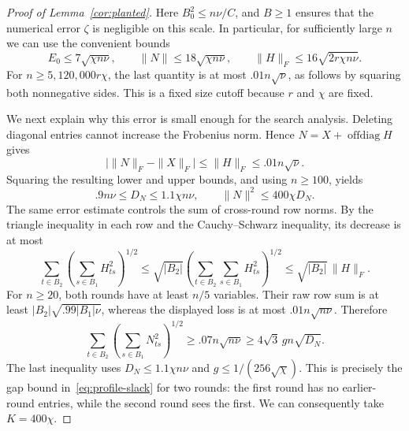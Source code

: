 \documentclass[11pt,a4paper]{article}
\theoremstyle{definition}
\theoremstyle{remark}
\begin{document}
\begin{proof}[Proof of Lemma~\ref{cor:planted}]
Here $B_0^2\le n\nu/C$, and $B\ge1$ ensures that the numerical error
$\zeta$ is negligible on this scale. In particular, for sufficiently
large $n$ we can use the convenient bounds
\[
 E_0\le7\sqrt{\chi n\nu},\qquad
 \|N\|\le18\sqrt{\chi n\nu},\qquad
 \|H\|_F\le16\sqrt{2r\chi n\nu}.
\]
For $n\ge5{,}120{,}000r\chi$, the last quantity is at most
$.01n\sqrt\nu$, as follows by squaring both nonnegative sides.
This is a fixed size cutoff because $r$ and $\chi$ are fixed.

We next explain why this error is small enough for the search analysis.
Deleting diagonal entries cannot increase the Frobenius norm. Hence
$N=X+\operatorname{offdiag}H$ gives
\[
 \bigl|\|N\|_F-\|X\|_F\bigr|\le\|H\|_F\le.01n\sqrt\nu.
\]
Squaring the resulting lower and upper bounds, and using $n\ge100$,
yields
\[
 .9n\nu\le D_N\le1.1\chi n\nu,\qquad \|N\|^2\le400\chi D_N.
\]
The same error estimate controls the sum of cross-round row norms.
By the triangle inequality in each row and the Cauchy--Schwarz inequality,
its decrease is at most
\[
 \sum_{t\in B_2}\left(\sum_{s\in B_1}H_{ts}^2\right)^{1/2}
 \le\sqrt{|B_2|}\left(\sum_{t\in B_2}\sum_{s\in B_1}H_{ts}^2\right)^{1/2}
 \le\sqrt{|B_2|}\,\|H\|_F.
\]
For $n\ge20$, both rounds have at least $n/5$ variables. Their raw
row sum is at least $|B_2|\sqrt{.99|B_1|\nu}$, whereas the displayed
loss is at most $.01n\sqrt{n\nu}$. Therefore
\[
 \sum_{t\in B_2}\left(\sum_{s\in B_1}N_{ts}^2\right)^{1/2}
 \ge .07n\sqrt{n\nu}
 \ge4\sqrt3\,gn\sqrt{D_N}.
\]
The last inequality uses $D_N\le1.1\chi n\nu$ and
$g\le1/(256\sqrt\chi)$. This is precisely the gap bound
in~\eqref{eq:profile-slack} for two rounds: the first round has no
earlier-round entries, while the second round sees the first. We can consequently take $K=400\chi$.


\end{proof}
\end{document}

